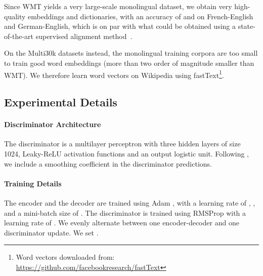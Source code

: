 \documentclass{article} \usepackage{iclr2018_conference,times}
\begin{document}
Since WMT yields a very large-scale monolingual dataset, we obtain very high-quality embeddings and dictionaries, with an accuracy of  and  on French-English and German-English, which is on par with what could be obtained using a state-of-the-art supervised alignment method~\citep{wordalign17}.
 
On the Multi30k datasets instead, the monolingual training corpora are too small to train good word embeddings (more than two order of magnitude smaller than WMT). We therefore learn word vectors on Wikipedia using fastText\footnote{Word vectors downloaded from: \url{https://github.com/facebookresearch/fastText}}.

\subsection{Experimental Details}

\paragraph{Discriminator Architecture} The discriminator is a multilayer perceptron with three hidden layers of size 1024, Leaky-ReLU activation functions and an output logistic unit. Following \cite{goodfellow2016nips}, we include a smoothing coefficient  in the discriminator predictions. 

\paragraph{Training Details} The encoder and the decoder are trained using Adam \citep{kingma2014adam}, with a learning rate of , , and a mini-batch size of . The discriminator is trained using RMSProp \citep{Tieleman2012} with a learning rate of . We evenly alternate  between one encoder-decoder and one discriminator update. We set .
\end{document}
